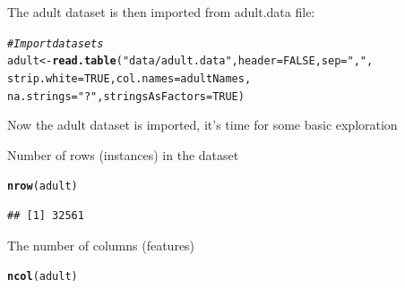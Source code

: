 \documentclass[10pt  ,usenames, dvipsnames]{article}\usepackage[]{graphicx}\usepackage[]{color}
\makeatletter
\newcommand{\hlnum}[1]{\textcolor[rgb]{0.686,0.059,0.569}{#1}}%
\newcommand{\hlstr}[1]{\textcolor[rgb]{0.192,0.494,0.8}{#1}}%
\newcommand{\hlcom}[1]{\textcolor[rgb]{0.678,0.584,0.686}{\textit{#1}}}%
\newcommand{\hlstd}[1]{\textcolor[rgb]{0.345,0.345,0.345}{#1}}%
\newcommand{\hlkwb}[1]{\textcolor[rgb]{0.69,0.353,0.396}{#1}}%
\newcommand{\hlkwc}[1]{\textcolor[rgb]{0.333,0.667,0.333}{#1}}%
\newcommand{\hlkwd}[1]{\textcolor[rgb]{0.737,0.353,0.396}{\textbf{#1}}}%
\newenvironment{kframe}{%
 \def\at@end@of@kframe{}%
 \ifinner\ifhmode%
  \def\at@end@of@kframe{\end{minipage}}%
  \begin{minipage}{\columnwidth}%
 \fi\fi%
 \def\FrameCommand##1{\hskip\@totalleftmargin \hskip-\fboxsep
 \colorbox{shadecolor}{##1}\hskip-\fboxsep
     \hskip-\linewidth \hskip-\@totalleftmargin \hskip\columnwidth}%
 \MakeFramed {\advance\hsize-\width
   \@totalleftmargin\z@ \linewidth\hsize
   \@setminipage}}%
 {\par\unskip\endMakeFramed%
 \at@end@of@kframe}
\newenvironment{knitrout}{}{} %
\makeatother
\begin{document}
The adult dataset is then imported from adult.data file:
\begin{knitrout}
\color{fgcolor}\begin{kframe}
\begin{alltt}
\hlcom{#Import datasets}
\hlstd{adult} \hlkwb{<-} \hlkwd{read.table}\hlstd{(}\hlstr{"data/adult.data"} \hlstd{,}\hlkwc{header} \hlstd{=} \hlnum{FALSE}\hlstd{,} \hlkwc{sep} \hlstd{=} \hlstr{","}\hlstd{,}
                         \hlkwc{strip.white} \hlstd{=} \hlnum{TRUE}\hlstd{,} \hlkwc{col.names} \hlstd{= adultNames,}
                         \hlkwc{na.strings} \hlstd{=} \hlstr{"?"}\hlstd{,} \hlkwc{stringsAsFactors} \hlstd{=} \hlnum{TRUE}\hlstd{)}
\end{alltt}
\end{kframe}
\end{knitrout}




Now the adult dataset is imported, it's time for some basic exploration

Number of rows (instances) in the dataset

\begin{knitrout}
\color{fgcolor}\begin{kframe}
\begin{alltt}
\hlkwd{nrow}\hlstd{(adult)}
\end{alltt}
\end{kframe}
\end{knitrout}

\begin{knitrout}
\color{fgcolor}\begin{kframe}
\begin{verbatim}
## [1] 32561
\end{verbatim}
\end{kframe}
\end{knitrout}

The number of columns (features)

\begin{knitrout}
\color{fgcolor}\begin{kframe}
\begin{alltt}
\hlkwd{ncol}\hlstd{(adult)}
\end{alltt}
\end{kframe}
\end{knitrout}
\end{document}
